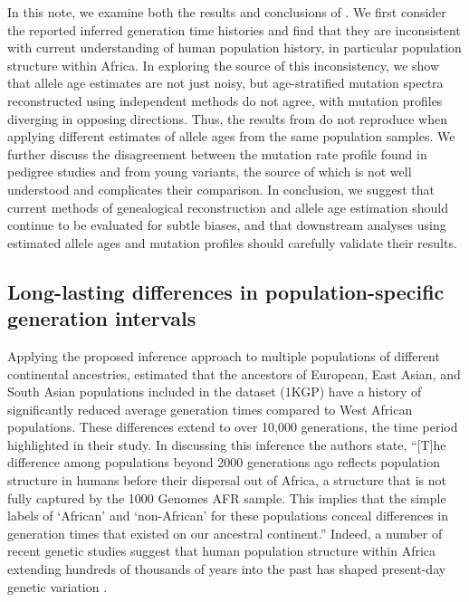 \documentclass[]{article}
\begin{document}
In this note, we examine both the results and conclusions of
\citet{wang2023human}. We first consider the reported inferred generation time
histories and find that they are inconsistent with current understanding of
human population history, in particular population structure within Africa. In
exploring the source of this inconsistency, we show that allele age estimates
are not just noisy, but age-stratified mutation spectra reconstructed using
independent methods do not agree, with mutation profiles diverging in opposing
directions. Thus, the results from \citet{wang2023human} do not reproduce
when applying different estimates of allele ages from the same population samples. We
further discuss the disagreement between the mutation rate profile found in
pedigree studies and from young variants, the source of which is not well
understood and complicates their comparison. In conclusion, we suggest that
current methods of genealogical reconstruction and allele age estimation
should continue to be evaluated for subtle biases, and that
downstream analyses using estimated allele ages and mutation profiles should
carefully validate their results.

\subsection*{Long-lasting differences in population-specific generation intervals}

Applying the proposed inference approach to multiple populations of different
continental ancestries, \citet{wang2023human} estimated that the ancestors of
European, East Asian, and South Asian populations included in the
\citet{1000genomes2015} dataset (1KGP) have a history of significantly reduced
average generation times compared to West African populations. These
differences extend to over 10,000 generations, the time period highlighted in
their study.
In discussing this inference the authors state, ``[T]he difference
among populations beyond 2000 generations ago reflects population structure in
humans before their dispersal out of Africa, a structure that is not fully
captured by the 1000 Genomes AFR sample. This implies that the simple labels of
`African' and `non-African' for these populations conceal differences in
generation times that existed on our ancestral continent.'' Indeed, a number of
recent genetic studies suggest that human population structure within Africa
extending hundreds of thousands of years into the past has shaped
present-day genetic variation
\citep{hammer2011genetic,hsieh2016model,hey2018phylogeny,
ragsdale2019models,lorente2019whole,durvasula2020recovering}.
\end{document}
